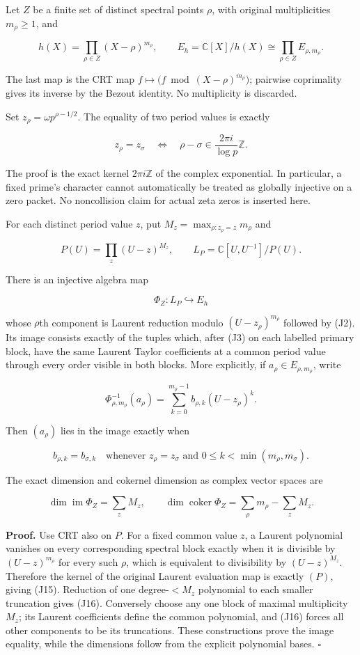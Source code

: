 Let \(Z\) be a finite set of distinct spectral points \(\rho\), with original multiplicities \(m_\rho \ge 1\), and

\[
h(X)=\prod_{\rho\in Z}(X-\rho)^{m_\rho},\qquad
E_h=\mathbb C[X]/h(X)
\cong\prod_{\rho\in Z}E_{\rho,m_\rho}.
\]

The last map is the CRT map \(f\longmapsto\bigl(f\bmod(X-\rho)^{m_\rho}\bigr)\); pairwise coprimality gives its inverse by the Bezout identity. No multiplicity is discarded.

Set \(z_\rho =\omega  p^{\rho -1/2}\). The equality of two period values is exactly

\[
z_\rho=z_\sigma
\quad\Longleftrightarrow\quad
\rho-\sigma\in\frac{2\pi i}{\log p}\mathbb Z.
\tag{J14}
\]

The proof is the exact kernel \(2\pi i\mathbb Z\) of the complex exponential. In particular, a fixed prime's character cannot automatically be treated as globally injective on a zero packet. No noncollision claim for actual zeta zeros is inserted here.

For each distinct period value \(z\), put \(M_z=\max_{\rho :z_\rho =z}m_\rho\) and

\[
P(U)=\prod_z(U-z)^{M_z},\qquad
L_P=\mathbb C[U,U^{-1}]/P(U).
\]

There is an injective algebra map

\[
\Phi_Z:L_P\hookrightarrow E_h
\tag{J15}
\]

whose \(\rho\)th component is Laurent reduction modulo \((U-z_\rho )^{m_\rho }\) followed by (J2). Its image consists exactly of the tuples which, after (J3) on each labelled primary block, have the same Laurent Taylor coefficients at a common period value through every order visible in both blocks. More explicitly, if \(a_\rho \in E_{\rho ,m_\rho }\), write

\[
\Phi_{\rho,m_\rho}^{-1}(a_\rho)
=\sum_{k=0}^{m_\rho-1}b_{\rho,k}(U-z_\rho)^k.
\]

Then \((a_\rho )\) lies in the image exactly when

\[
b_{\rho,k}=b_{\sigma,k}
\quad\text{whenever }z_\rho=z_\sigma
\text{ and }0\le k<\min(m_\rho,m_\sigma).
\tag{J16}
\]

The exact dimension and cokernel dimension as complex vector spaces are

\[
\dim\operatorname{im}\Phi_Z=\sum_zM_z,
\qquad
\dim\operatorname{coker}\Phi_Z
=\sum_\rho m_\rho-\sum_zM_z.
\tag{J17}
\]

\textbf{Proof.} Use CRT also on \(P\). For a fixed common value \(z\), a Laurent polynomial vanishes on every corresponding spectral block exactly when it is divisible by \((U-z)^{m_\rho }\) for every such \(\rho\), which is equivalent to divisibility by \((U-z)^{M_z}\). Therefore the kernel of the original Laurent evaluation map is exactly \((P)\), giving (J15). Reduction of one degree-\(<M_z\) polynomial to each smaller truncation gives (J16). Conversely choose any one block of maximal multiplicity \(M_z\); its Laurent coefficients define the common polynomial, and (J16) forces all other components to be its truncations. These constructions prove the image equality, while the dimensions follow from the explicit polynomial bases. \(\square\)

